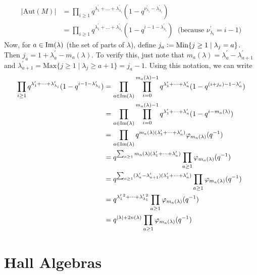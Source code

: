 \begin{equation}
    \begin{split}
        |\text{Aut}(M)|&=\prod_{i\geq1}q^{\lambda_1^\prime+\dots+\lambda_{\lambda_i}^\prime}(1-q^{\nu_{\lambda_i}^\prime-\lambda_{\lambda_i}^\prime})\\
        &=\prod_{i\geq1}q^{\lambda_1^\prime+\dots+\lambda_{\lambda_i}^\prime}(1-q^{i-1-\lambda_{\lambda_i}^\prime})\; \text{ (because }\nu_{\lambda_i}^\prime=i-1)
    \end{split}
\end{equation}
Now, for $a\in \text{Im}(\lambda)$ (the set of parts of $\lambda$), define $j_a\bydef\text{Min}\{j\geq1\;|\;\lambda_j=a\}$. Then $j_a=1+\lambda_a^\prime-m_a(\lambda)$. To verify this, just note that $m_a(\lambda)=\lambda_a^\prime-\lambda_{a+1}^\prime$ and $\lambda_{a+1}^\prime=\text{Max}\{j\geq1\;|\;\lambda_j\geq a+1\}=j_a-1$. Using this notation, we can write
\begin{equation}
    \begin{split}
        \prod_{i\geq1}q^{\lambda_1^\prime+\dots+\lambda_{\lambda_i}^\prime}(1-q^{i-1-\lambda_{\lambda_i}^\prime}) &=\prod_{a\in\text{Im}(\lambda)}\prod_{i=0}^{m_a(\lambda)-1}q^{\lambda_1^\prime+\dots+\lambda_a^\prime}(1-q^{(i+j_a)-1-\lambda_a^\prime})\\
        &=\prod_{a\in\text{Im}(\lambda)}\prod_{i=0}^{m_a(\lambda)-1}q^{\lambda_1^\prime+\dots+\lambda_a^\prime}(1-q^{i-m_a(\lambda)})\\
        &=\prod_{a\in\text{Im}(\lambda)} q^{m_a(\lambda)(\lambda_1^\prime+\dots+\lambda_a^\prime)}\varphi_{m_a(\lambda)}(q^{-1})\\
        &=q^{\sum_{a\geq1}m_a(\lambda)(\lambda_1^\prime+\dots+\lambda_a^\prime)}\prod_{a\geq1}\varphi_{m_a(\lambda)}(q^{-1})\\
         &=q^{\sum_{a\geq1}(\lambda_a^\prime-\lambda_{a+1}^\prime)(\lambda_1^\prime+\dots+\lambda_a^\prime)}\prod_{a\geq1}\varphi_{m_a(\lambda)}(q^{-1})\\
         &=q^{\lambda_1^{\prime\;2}+\dots+\lambda_{\lambda_1}^{\prime\;2}}\prod_{a\geq1}\varphi_{m_a(\lambda)}(q^{-1})\\
            &=q^{|\lambda|+2n(\lambda)}\prod_{a\geq1}\varphi_{m_a(\lambda)}(q^{-1})
    \end{split}
\end{equation}
\section{Hall Algebras}
